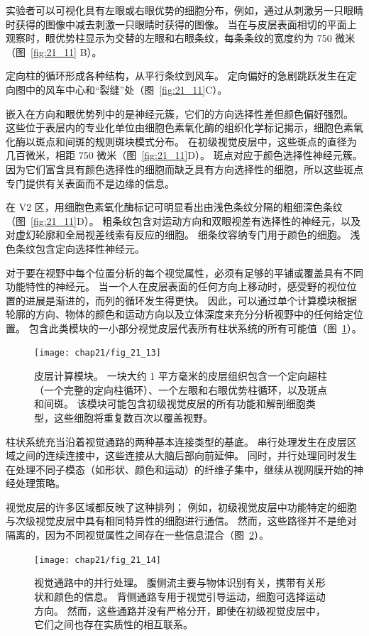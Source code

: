 实验者可以可视化具有左眼或右眼优势的细胞分布，例如，通过从刺激另一只眼睛时获得的图像中减去刺激一只眼睛时获得的图像。 
当在与皮层表面相切的平面上观察时，眼优势柱显示为交替的左眼和右眼条纹，每条条纹的宽度约为 750 微米（图~\ref{fig:21_11} B）。


定向柱的循环形成各种结构，从平行条纹到风车。 
定向偏好的急剧跳跃发生在定向图中的风车中心和“裂缝”处（图~\ref{fig:21_11}C）。


嵌入在方向和眼优势列中的是神经元簇，它们的方向选择性差但颜色偏好强烈。
这些位于表层内的专业化单位由细胞色素氧化酶的组织化学标记揭示，细胞色素氧化酶以斑点和间斑的规则斑块模式分布。
在初级视觉皮层中，这些斑点的直径为几百微米，相距 750 微米（图~\ref{fig:21_11}D）。
斑点对应于颜色选择性神经元簇。
因为它们富含具有颜色选择性的细胞而缺乏具有方向选择性的细胞，所以这些斑点专门提供有关表面而不是边缘的信息。


在 V2 区，用细胞色素氧化酶标记可明显看出由浅色条纹分隔的粗细深色条纹（图~\ref{fig:21_11}D）。
粗条纹包含对运动方向和双眼视差有选择性的神经元，以及对虚幻轮廓和全局视差线索有反应的细胞。
细条纹容纳专门用于颜色的细胞。
浅色条纹包含定向选择性神经元。


对于要在视野中每个位置分析的每个视觉属性，必须有足够的平铺或覆盖具有不同功能特性的神经元。
当一个人在皮层表面的任何方向上移动时，感受野的视位位置的进展是渐进的，而列的循环发生得更快。
因此，可以通过单个计算模块根据轮廓的方向、物体的颜色和运动方向以及立体深度来充分分析视野中的任何给定位置。
包含此类模块的一小部分视觉皮层代表所有柱状系统的所有可能值（图~\ref{fig:21_13}）。


\begin{figure}[htbp]
	\centering
	\texttt{[image: chap21/fig\_21\_13]}
	\caption{皮层计算模块。 
		一块大约 1 平方毫米的皮层组织包含一个定向超柱（一个完整的定向柱循环）、一个左眼和右眼优势柱循环，以及斑点和间斑。
		该模块可能包含初级视觉皮层的所有功能和解剖细胞类型，这些细胞将重复数百次以覆盖视野\cite{hubel1995eye}。}
	\label{fig:21_13}
\end{figure}


柱状系统充当沿着视觉通路的两种基本连接类型的基底。
串行处理发生在皮层区域之间的连续连接中，这些连接从大脑后部向前延伸。
同时，并行处理同时发生在处理不同子模态（如形状、颜色和运动）的纤维子集中，继续从视网膜开始的神经处理策略。


视觉皮层的许多区域都反映了这种排列；
例如，初级视觉皮层中功能特定的细胞与次级视觉皮层中具有相同特异性的细胞进行通信。
然而，这些路径并不是绝对隔离的，因为不同视觉属性之间存在一些信息混合（图~\ref{fig:21_14}）。


\begin{figure}[htbp]
	\centering
	\texttt{[image: chap21/fig\_21\_14]}
	\caption{视觉通路中的并行处理。
		腹侧流主要与物体识别有关，携带有关形状和颜色的信息。
		背侧通路专用于视觉引导运动，细胞可选择运动方向。
		然而，这些通路并没有严格分开，即使在初级视觉皮层中，它们之间也存在实质性的相互联系。}
	\label{fig:21_14}
\end{figure}


